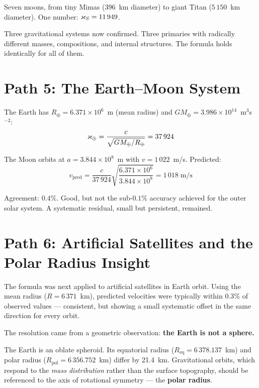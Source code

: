 Seven moons, from tiny Mimas ($396$~km diameter) to giant Titan ($5\,150$~km diameter).  One number: $\varkappa_S = 11\,949$.

Three gravitational systems now confirmed.  Three primaries with radically different masses, compositions, and internal structures.  The formula holds identically for all of them.


\section{Path 5: The Earth--Moon System}
\label{sec:path5}

The Earth has $R_\oplus = 6.371 \times 10^6$~m (mean radius) and $GM_\oplus = 3.986 \times 10^{14}$~m$^3$s$^{-2}$:
\begin{equation}
  \varkappa_\oplus = \frac{c}{\sqrt{GM_\oplus/R_\oplus}} = 37\,924
\end{equation}

The Moon orbits at $a = 3.844 \times 10^8$~m with $v = 1\,022$~m/s.  Predicted:
\begin{equation}
  v_{\text{pred}} = \frac{c}{37\,924}\sqrt{\frac{6.371 \times 10^6}{3.844 \times 10^8}} = 1\,018\;\text{m/s}
\end{equation}

Agreement: $0.4\%$.  Good, but not the sub-$0.1\%$ accuracy achieved for the outer solar system.  A systematic residual, small but persistent, remained.


\section{Path 6: Artificial Satellites and the Polar Radius Insight}
\label{sec:path6}

The formula was next applied to artificial satellites in Earth orbit.  Using the mean radius ($R = 6\,371$~km), predicted velocities were typically within $0.3\%$ of observed values --- consistent, but showing a small systematic offset in the same direction for every orbit.

The resolution came from a geometric observation: \textbf{the Earth is not a sphere.}

The Earth is an oblate spheroid.  Its equatorial radius ($R_{\text{eq}} = 6\,378.137$~km) and polar radius ($R_{\text{pol}} = 6\,356.752$~km) differ by 21.4~km.  Gravitational orbits, which respond to the \emph{mass distribution} rather than the surface topography, should be referenced to the axis of rotational symmetry --- the \textbf{polar radius}.

